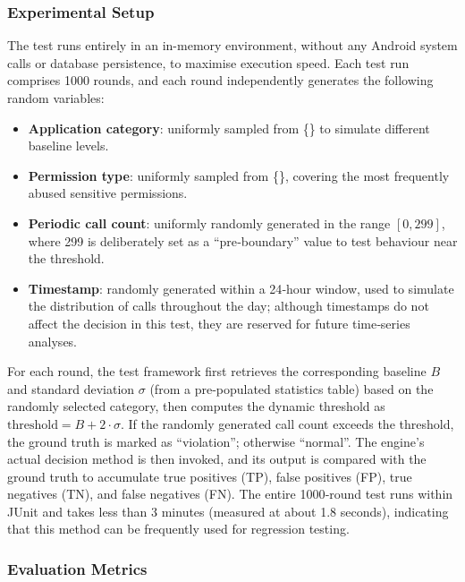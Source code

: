 \subsubsection{Experimental Setup}

The test runs entirely in an in-memory environment, without any Android system calls or database persistence, to maximise execution speed. Each test run comprises 1000 rounds, and each round independently generates the following random variables:

\begin{itemize}
\item \textbf{Application category}: uniformly sampled from \{\} to simulate different baseline levels.
\item \textbf{Permission type}: uniformly sampled from \{\}, covering the most frequently abused sensitive permissions.
\item \textbf{Periodic call count}: uniformly randomly generated in the range $[0, 299]$, where 299 is deliberately set as a “pre‑boundary” value to test behaviour near the threshold.
\item \textbf{Timestamp}: randomly generated within a 24‑hour window, used to simulate the distribution of calls throughout the day; although timestamps do not affect the decision in this test, they are reserved for future time‑series analyses.
\end{itemize}

For each round, the test framework first retrieves the corresponding baseline $B$ and standard deviation $\sigma$ (from a pre‑populated statistics table) based on the randomly selected category, then computes the dynamic threshold as $\text{threshold} = B + 2 \cdot \sigma$. If the randomly generated call count exceeds the threshold, the ground truth is marked as “violation”; otherwise “normal”. The engine's actual decision method is then invoked, and its output is compared with the ground truth to accumulate true positives (TP), false positives (FP), true negatives (TN), and false negatives (FN). The entire 1000‑round test runs within JUnit and takes less than 3 minutes (measured at about 1.8 seconds), indicating that this method can be frequently used for regression testing.

\subsubsection{Evaluation Metrics}

